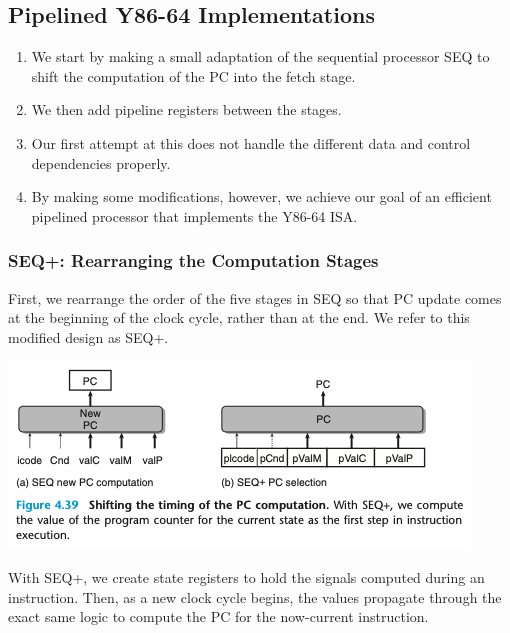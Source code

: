 \documentclass[11pt]{article}
\begin{document}
\subsection{Pipelined Y86-64 Implementations}
\label{sec:orgf33a34f}
\begin{enumerate}
\item We start by making a small adaptation of the sequential processor SEQ to shift the computation of the PC into the fetch stage.\\
\item We then add pipeline registers between the stages.\\
\item Our first attempt at this does not handle the different data and control dependencies properly.\\
\item By making some modifications, however, we achieve our goal of an efficient pipelined processor that implements the Y86-64 ISA.\\
\end{enumerate}

\subsubsection{SEQ+: Rearranging the Computation Stages}
\label{sec:orgfe75655}
First, we rearrange the order of the five stages in SEQ so that PC update comes at the beginning of the clock cycle, rather than at the end. We refer to this modified design as SEQ+.\\

\begin{center}
\includegraphics[width=.9\linewidth]{pics/figure4.39-shifting-the-timing-of-the-pc-computation.png}
\end{center}

With SEQ+, we create state registers to hold the signals computed during an instruction. Then, as a new clock cycle begins, the values propagate through the exact same logic to compute the PC for the now-current instruction.\\
\end{document}
